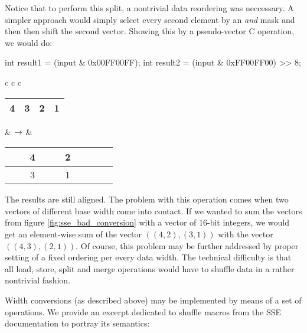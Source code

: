 Notice that to perform this split, a nontrivial data reordering was neccessary. A simpler approach would simply select every second element by an \emph{and} mask and then then shift the second vector. Showing this by a pseudo-vector C operation, we would do:

\mybeginfig
\begin{code}
int result1 = (input & 0x00FF00FF);
int result2 = (input & 0xFF00FF00) >> 8; 
\end{code}
\begin{longtable}{ c c c }
\begin{tabular}{|c|c|c|c|}
\hline
 4 & 3 & 2 & 1 \tabularnewline
\hline
\end{tabular}
&
$\rightarrow$
&
\begin{tabular}{|c|c|c|c|c|c|c|c|}
\hline
 \ \ & 4 & \ \ & 2 \tabularnewline
\hline
 \ \ & 3 & \ \ & 1 \tabularnewline
\hline
\end{tabular}
\end{longtable}

The results are still aligned. The problem with this operation comes when two vectors of different base width come into contact. If we wanted to sum the vectors from figure \ref{fig:sse_bad_conversion} with a vector of 16-bit integers, we would get an element-wise sum of the vector $((4,2),(3,1))$ with the vector $((4,3),(2,1))$. Of course, this problem may be further addressed by proper setting of a fixed ordering per every data width. The technical difficulty is that all load, store, split and merge operations would have to shuffle data in a rather nontrivial fashion. 


Width conversions (as described above) may be implemented by means of a set of  operations. We provide an excerpt dedicated to shuffle macros from the SSE documentation \cite{TODO} to portray its semantics: 




